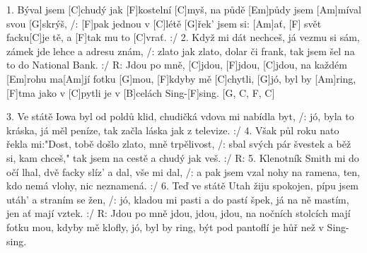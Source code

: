 
1. Býval jsem [C]chudý jak [F]kostelní [C]myš,
na půdě [Em]půdy jsem [Am]míval svou [G]skrýš,
/: [F]pak jednou v [C]létě [G]\null řek' jsem si: [Am]ať,
[F] svět facku[C]je tě, a [F]tak mu to [C]vrať. :/
2. Když mi dát nechceš, já vezmu si sám,
zámek jde lehce a adresu znám,
/: zlato jak zlato, dolar či frank,
tak jsem šel na to do National Bank. :/
R: Jdou po mně, [C]jdou, [F]jdou, [C]jdou,
na každém [Em]rohu ma[Am]jí fotku [G]mou,
[F]kdyby mě [C]chytli, [G]jó, byl by [Am]ring,
[F]tma jako v [C]pytli je v [B]celách Sing-[F]sing.
[G, C, F, C]
\columnbreak


3. Ve státě Iowa byl od poldů klid,
chudičká vdova mi nabídla byt,
/: jó, byla to kráska, já měl peníze,
tak začla láska jak z televize. :/
4. Však půl roku nato řekla mi:"Dost,
tobě došlo zlato, mně trpělivost,
/: sbal svých pár švestek a běž si, kam chceš,"
tak jsem na cestě a chudý jak veš. :/
R:
5. Klenotník Smith mi do očí lhal,
dvě facky slíz' a dal, vše mi dal,
/: a pak jsem vzal nohy na ramena,
ten, kdo nemá vlohy, nic neznamená. :/
6. Teď ve státě Utah žiju spokojen,
pípu jsem utáh' a straním se žen,
/: jó, kladou mi pasti a do pastí špek,
já na ně mastím, jen ať mají vztek. :/
R: Jdou po mně jdou, jdou, jdou,
na nočních stolcích mají fotku mou,
kdyby mě klofly, jó, byl by ring,
být pod pantoflí je hůř než v Sing-sing.

